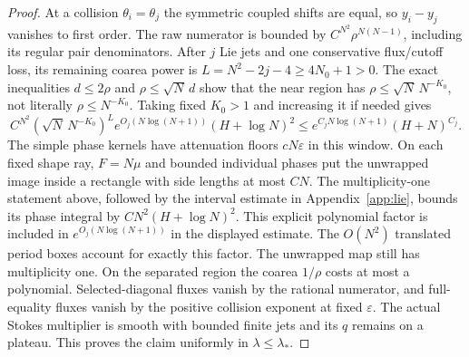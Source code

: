 \documentclass[11pt]{article}
\numberwithin{equation}{section}
\theoremstyle{definition}
\newcommand{\eps}{\varepsilon}
\begin{document}
\begin{proof}
At a collision \(\theta_i=\theta_j\) the symmetric coupled shifts
are equal, so \(y_i-y_j\) vanishes to first order. The raw numerator
is bounded by \(C^{N^2}\rho^{N(N-1)}\), including its regular pair
denominators. After \(j\) Lie jets and one conservative flux/cutoff
loss, its remaining coarea power is
\(L=N^2-2j-4\ge4N_0+1>0\).
The exact inequalities \(d\le2\rho\) and \(\rho\le\sqrt N\,d\)
show that the near region
has \(\rho\le\sqrt N\,N^{-K_0}\), not literally \(\rho\le N^{-K_0}\).
Taking fixed \(K_0>1\) and increasing it if needed gives
\[
 C^{N^2}(\sqrt N\,N^{-K_0})^L
      e^{O_j(N\log(N+1))}(H+\log N)^2
 \le e^{C_jN\log(N+1)}(H+N)^{C_j}.
\]
The simple phase kernels have attenuation floors \(cN\eps\) in
this window. On each fixed shape ray, \(F=N\mu\) and bounded individual
phases put the unwrapped image inside a rectangle with side lengths
at most \(CN\). The multiplicity-one statement above, followed by
the interval estimate in Appendix~\ref{app:lie}, bounds its phase
integral by \(CN^2(H+\log N)^2\). This explicit polynomial factor
is included in \(e^{O_j(N\log(N+1))}\) in the displayed estimate.
The \(O(N^2)\) translated period boxes account for exactly this
factor. The unwrapped map still has multiplicity one.
On the separated region the coarea \(1/\rho\) costs at most a
polynomial.
Selected-diagonal fluxes vanish by the rational numerator, and
full-equality fluxes vanish by the positive collision exponent at
fixed \(\eps\). The actual Stokes multiplier is smooth with bounded
finite jets and its \(q\) remains on a plateau. This proves the
claim uniformly in \(\lambda\le\lambda_*\).
\end{proof}
\end{document}
